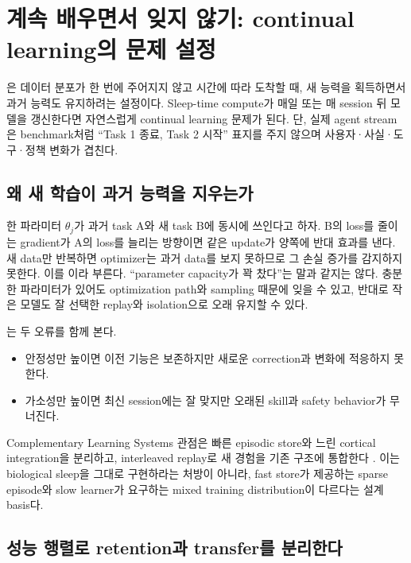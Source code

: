 \chapter{계속 배우면서 잊지 않기: continual learning의 문제 설정}
\label{bg:chapter-continual-learning}

은 데이터 분포가 한 번에 주어지지 않고 시간에 따라 도착할 때,
새 능력을 획득하면서 과거 능력도 유지하려는 설정이다. Sleep-time compute가 매일 또는 매 session 뒤
모델을 갱신한다면 자연스럽게 continual learning 문제가 된다. 단, 실제 agent stream은 benchmark처럼
``Task 1 종료, Task 2 시작'' 표지를 주지 않으며 사용자·사실·도구·정책 변화가 겹친다.

\section{왜 새 학습이 과거 능력을 지우는가}

한 파라미터 $\theta_j$가 과거 task A와 새 task B에 동시에 쓰인다고 하자. B의 loss를 줄이는 gradient가
A의 loss를 늘리는 방향이면 같은 update가 양쪽에 반대 효과를 낸다. 새 data만 반복하면 optimizer는
과거 data를 보지 못하므로 그 손실 증가를 감지하지 못한다. 이를 이라 부른다. ``parameter capacity가 꽉 찼다''는 말과 같지는 않다. 충분한 파라미터가 있어도
optimization path와 sampling 때문에 잊을 수 있고, 반대로 작은 모델도 잘 선택한 replay와 isolation으로
오래 유지할 수 있다.

는 두 오류를 함께 본다.

\begin{itemize}
  \item 안정성만 높이면 이전 기능은 보존하지만 새로운 correction과 변화에 적응하지 못한다.
  \item 가소성만 높이면 최신 session에는 잘 맞지만 오래된 skill과 safety behavior가 무너진다.
\end{itemize}

Complementary Learning Systems 관점은 빠른 episodic store와 느린 cortical integration을 분리하고,
interleaved replay로 새 경험을 기존 구조에 통합한다 \parencite{mcclelland1995cls}. 이는 biological
sleep을 그대로 구현하라는 처방이 아니라, fast store가 제공하는 sparse episode와 slow learner가
요구하는 mixed training distribution이 다르다는 설계 basis다.

\section{성능 행렬로 retention과 transfer를 분리한다}

